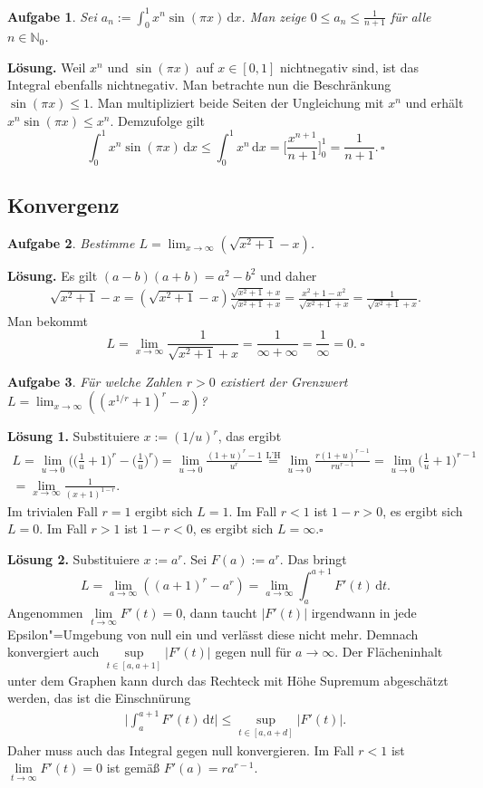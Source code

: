 \documentclass[a4paper,10pt,fleqn,twoside]{scrartcl}
\numberwithin{equation}{section}
\newcommand{\N}{\mathbb N}
\newcommand{\strong}[1]{{\normalfont\sffamily\bfseries #1}}
\renewcommand{\qedsymbol}{\ensuremath{\square}}
\theoremstyle{Aufgabe}
\newtheorem{Aufgabe}{\sffamily Aufgabe}[section]
\begin{document}
\begin{Aufgabe}
Sei $a_n:=\int_0^1 x^n \sin(\pi x)\,\mathrm dx$. Man zeige
$0\le a_n\le \frac{1}{n+1}$ für alle $n\in\N_0$.
\end{Aufgabe}

\noindent
\strong{Lösung.} Weil $x^n$ und $\sin(\pi x)$ auf $x\in [0,1]$
nichtnegativ sind, ist das Integral ebenfalls nichtnegativ. Man
betrachte nun die Beschränkung $\sin(\pi x)\le 1$. Man multipliziert
beide Seiten der Ungleichung mit $x^n$ und erhält
$x^n\sin(\pi x)\le x^n$. Demzufolge gilt
\[\int_0^1 x^n\sin(\pi x)\,\mathrm dx \le \int_0^1 x^n\,\mathrm dx
= \bigg[\frac{x^{n+1}}{n+1}\bigg]_0^1 = \frac{1}{n+1}.\,\qedsymbol\]

\subsection{Konvergenz}
\begin{Aufgabe}
Bestimme $L=\lim_{x\to\infty}(\sqrt{x^2+1}-x)$.
\end{Aufgabe}
\strong{Lösung.} Es gilt $(a-b)(a+b)=a^2-b^2$ und daher
\begin{gather*}
\sqrt{x^2+1}-x = (\sqrt{x^2+1}-x)\frac{\sqrt{x^2+1}+x}{\sqrt{x^2+1}+x}
= \frac{x^2+1-x^2}{\sqrt{x^2+1}+x} = \frac{1}{\sqrt{x^2+1}+x}.
\end{gather*}
Man bekommt
\[L = \lim_{x\to\infty} \frac{1}{\sqrt{x^2+1}+x}
= \frac{1}{\infty+\infty} = \frac{1}{\infty} = 0.\;\qedsymbol\]

\begin{Aufgabe}
Für welche Zahlen $r>0$ existiert der Grenzwert\\
$L=\lim_{x\to\infty}((x^{1/r}+1)^r-x)$?
\end{Aufgabe}
\strong{Lösung 1.} Substituiere $x:=(1/u)^r$, das ergibt
\begin{gather*}
L = \lim_{u\to 0} \bigg(\bigg(\frac{1}{u}+1\bigg)^r-\bigg(\frac{1}{u}\bigg)^r\bigg)
= \lim_{u\to 0} \frac{(1+u)^r-1}{u^r}
\stackrel{\text{L'H}}= \lim_{u\to 0} \frac{r(1+u)^{r-1}}{ru^{r-1}}
= \lim_{u\to 0} \bigg(\frac{1}{u}+1\bigg)^{r-1}\\
= \lim_{x\to\infty}\frac{1}{(x+1)^{1-r}}.
\end{gather*}
Im trivialen Fall $r=1$ ergibt sich $L=1$. Im Fall $r<1$ ist
$1-r>0$, es ergibt sich $L=0$. Im Fall $r>1$ ist $1-r<0$,
es ergibt sich $L=\infty$.\;\qedsymbol

\strong{Lösung 2.} Substituiere $x:=a^r$. Sei $F(a):=a^r$.
Das bringt
\[L = \lim_{a\to\infty} ((a+1)^r-a^r)
= \lim_{a\to\infty} \int_a^{a+1} F'(t)\,\mathrm dt.\]
Angenommen $\lim\limits_{t\to\infty}F'(t)=0$, dann taucht $|F'(t)|$
irgendwann in jede Epsilon"=Umgebung von null ein und verlässt
diese nicht mehr. Demnach konvergiert auch
$\sup\limits_{t\in [a,a+1]}|F'(t)|$ gegen null für $a\to\infty$.
Der Flächeninhalt unter dem Graphen kann durch das Rechteck mit
Höhe Supremum abgeschätzt werden, das ist die Einschnürung%
\begin{gather*}
\bigg|\int_a^{a+1} F'(t)\,\mathrm dt\bigg| \le \sup_{t\in [a,a+d]} |F'(t)|.
\end{gather*}
Daher muss auch das Integral gegen null konvergieren.
Im Fall $r<1$ ist $\lim\limits_{t\to\infty}F'(t)=0$ ist gemäß $F'(a)=ra^{r-1}$.
\end{document}
